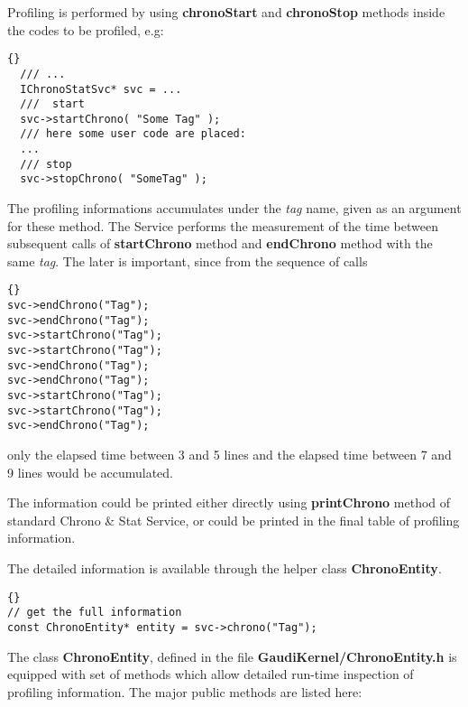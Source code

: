 \documentclass{lhcbnote}
\newcommand{\bftt}         {\ttfamily\bfseries}
\renewcommand{\it}         {\itshape}
\begin{document}
Profiling is performed by using {\bftt{chronoStart}} and 
{\bftt{chronoStop}} methods inside the codes to be profiled, e.g:

\begin{lstlisting}{}
  /// ...
  IChronoStatSvc* svc = ...  
  ///  start 
  svc->startChrono( "Some Tag" ); 
  /// here some user code are placed:    
  ... 
  /// stop 
  svc->stopChrono( "SomeTag" ); 
\end{lstlisting} 

The profiling informations accumulates 
under the {\it{tag}} name, given as an argument for these method. 
The Service performs the measurement of the 
time between subsequent calls of {\bftt{startChrono}}
 method and {\bftt{endChrono}} method with the same {\it{tag}}. 
The later is important, since from the sequence of calls

\begin{lstlisting}{} 
svc->endChrono("Tag"); 
svc->endChrono("Tag"); 
svc->startChrono("Tag"); 
svc->startChrono("Tag");
svc->endChrono("Tag");
svc->endChrono("Tag"); 
svc->startChrono("Tag"); 
svc->startChrono("Tag"); 
svc->endChrono("Tag"); 
\end{lstlisting} 

 only the elapsed time between 3 and 5 lines and the 
elapsed time between 7 and 9 lines would be accumulated.    

The information could be printed either directly 
using {\bftt{printChrono}} method of standard 
Chrono \& Stat Service, or could be printed in the 
final table of profiling information. 

The detailed information is available through 
the helper class {\bftt{ChronoEntity}}. 

\begin{lstlisting}{} 
// get the full information 
const ChronoEntity* entity = svc->chrono("Tag");
\end{lstlisting} 

The class {\bftt{ChronoEntity}}, defined in the file 
{\bftt{GaudiKernel/ChronoEntity.h}} is equipped with set 
of methods which allow detailed run-time inspection 
of profiling information. The major public methods
are listed here:
\end{document}
